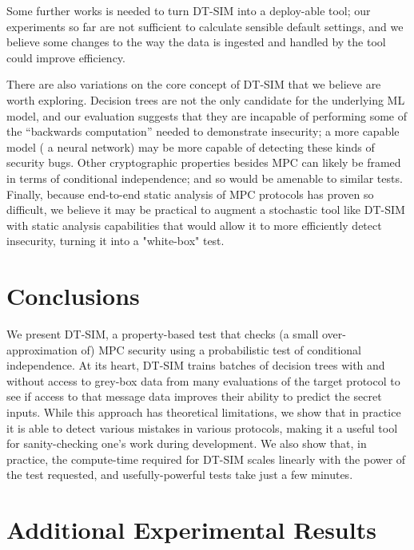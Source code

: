 \documentclass[compsoc, conference, a4paper, 10pt, times]{IEEEtran}
\newcommand{\toolname}{\textsc{DT-SIM}\xspace}
\begin{document}
Some further works is needed to turn \toolname into a deploy-able tool;
our experiments so far are not sufficient to calculate sensible default settings,
and we believe some changes to the way the data is ingested and handled by the tool could improve efficiency.

There are also variations on the core concept of \toolname that we believe are worth exploring.
Decision trees are not the only candidate for the underlying ML model, and our evaluation suggests that they are incapable of performing some of the ``backwards computation'' needed to demonstrate insecurity;
a more capable model (\eg{} a neural network) may be more capable of detecting these kinds of security bugs.
Other cryptographic properties besides MPC can likely be framed in terms of conditional independence;
and so would be amenable to similar tests.
Finally, because end-to-end static analysis of MPC protocols has proven so difficult,
we believe it may be practical to augment a stochastic tool like \toolname with static analysis capabilities
that would allow it to more efficiently detect insecurity, turning it into a "white-box" test.


\section{Conclusions}

We present \toolname,
a property-based test that checks (a small over-approximation of) MPC security
using a probabilistic test of conditional independence.
At its heart, \toolname trains batches of decision trees with and without access to grey-box data from many evaluations of the target protocol
to see if access to that message data improves their ability to predict the secret inputs.
While this approach has theoretical limitations, we show that in practice it is able to detect various mistakes in various protocols,
making it a useful tool for sanity-checking one's work during development.
We also show that, in practice, the compute-time required for \toolname scales linearly with the power of the test requested,
and usefully-powerful tests take just a few minutes.







\appendices

\section{Additional Experimental Results}
\label{sec:addit-exper-results}




\end{document}
